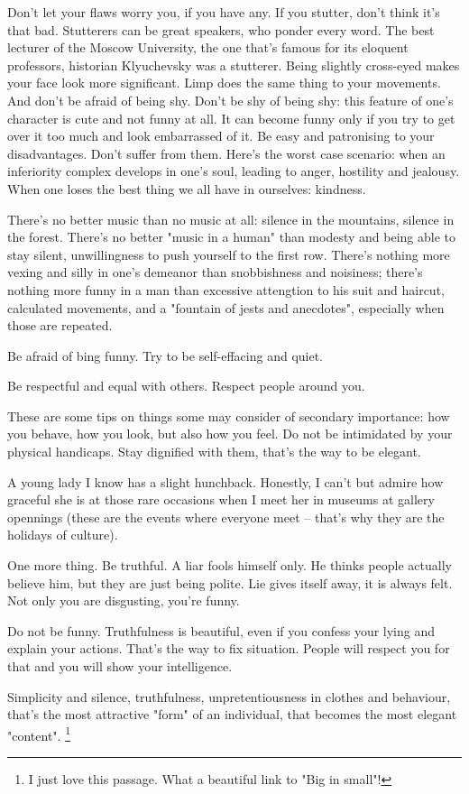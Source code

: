 Don't let your flaws worry you, if you have any. If you stutter, don't think it's that bad. Stutterers can be great speakers, who ponder every word. The best lecturer of the Moscow University, the one that's famous for its eloquent professors, historian Klyuchevsky was a stutterer. Being slightly cross-eyed makes your face look more significant. Limp does the same thing to your movements. And don't be afraid of being shy. Don't be shy of being shy: this feature of one's character is cute and not funny at all. It can become funny only if you try to get over it too much and look embarrassed of it. Be easy and patronising to your disadvantages. Don't suffer from them. Here's the worst case scenario: when an inferiority complex develops in one's soul, leading to anger, hostility and jealousy. When one loses the best thing we all have in ourselves: kindness.

There's no better music than no music at all: silence in the mountains, silence in the forest. There's no better "music in a human" than modesty and being able to stay silent, unwillingness to push yourself to the first row. There's nothing more vexing and silly in one's demeanor than snobbishness and noisiness; there's nothing more funny in a man than excessive attengtion to his suit and haircut, calculated movements, and a "fountain of jests and anecdotes", especially when those are repeated.

Be afraid of bing funny. Try to be self-effacing and quiet.

Be respectful and equal with others. Respect people around you.

These are some tips on things some may consider of secondary importance: how you behave, how you look, but also how you feel. Do not be intimidated by your physical handicaps. Stay dignified with them, that's the way to be elegant.

A young lady I know has a slight hunchback. Honestly, I can't but admire how graceful she is at those rare occasions when I meet her in museums at gallery opennings (these are the events where everyone meet -- that's why they are the holidays of culture).

One more thing. Be truthful. A liar fools himself only. He thinks people actually believe him, but they are just being polite. Lie gives itself away, it is always felt. Not only you are disgusting, you're funny.

Do not be funny. Truthfulness is beautiful, even if you confess your lying and explain your actions. That's the way to fix situation. People will respect you for that and you will show your intelligence.

Simplicity and silence, truthfulness, unpretentiousness in clothes and behaviour, that's the most attractive "form" of an individual, that becomes the most elegant "content". \footnote{I just love this passage. What a beautiful link to "Big in small"!}